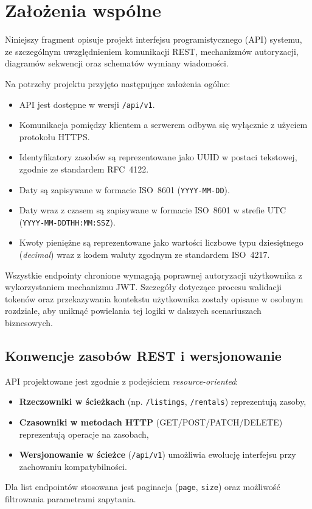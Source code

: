 \documentclass[11pt, a4paper]{article}
\begin{document}
\FloatBarrier


\section{Założenia wspólne}

Niniejszy fragment opisuje projekt interfejsu programistycznego (API) systemu,
ze szczególnym uwzględnieniem komunikacji REST, mechanizmów autoryzacji,
diagramów sekwencji oraz schematów wymiany wiadomości.

Na potrzeby projektu przyjęto następujące założenia ogólne:

\begin{itemize}
    \item API jest dostępne w wersji \texttt{/api/v1}.
    \item Komunikacja pomiędzy klientem a serwerem odbywa się wyłącznie z użyciem
    protokołu HTTPS.
    \item Identyfikatory zasobów są reprezentowane jako UUID w postaci tekstowej,
    zgodnie ze standardem RFC~4122.
    \item Daty są zapisywane w formacie ISO~8601 (\texttt{YYYY-MM-DD}).
    \item Daty wraz z czasem są zapisywane w formacie ISO~8601 w strefie UTC
    (\texttt{YYYY-MM-DDTHH:MM:SSZ}).
    \item Kwoty pieniężne są reprezentowane jako wartości liczbowe typu dziesiętnego
    (\textit{decimal}) wraz z kodem waluty zgodnym ze standardem ISO~4217.
\end{itemize}

Wszystkie endpointy chronione wymagają poprawnej autoryzacji użytkownika
z wykorzystaniem mechanizmu JWT. Szczegóły dotyczące procesu walidacji tokenów
oraz przekazywania kontekstu użytkownika zostały opisane w osobnym rozdziale,
aby uniknąć powielania tej logiki w dalszych scenariuszach biznesowych.


\subsection{Konwencje zasobów REST i wersjonowanie}
API projektowane jest zgodnie z podejściem \textit{resource-oriented}:
\begin{itemize}
    \item \textbf{Rzeczowniki w ścieżkach} (np. \texttt{/listings}, \texttt{/rentals}) reprezentują zasoby,
    \item \textbf{Czasowniki w metodach HTTP} (GET/POST/PATCH/DELETE) reprezentują operacje na zasobach,
    \item \textbf{Wersjonowanie w ścieżce} (\texttt{/api/v1}) umożliwia ewolucję interfejsu przy zachowaniu kompatybilności.
\end{itemize}
Dla list endpointów stosowana jest paginacja (\texttt{page}, \texttt{size}) oraz możliwość filtrowania parametrami zapytania.
\end{document}
